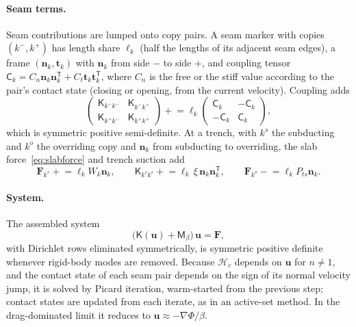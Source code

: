 \documentclass[11pt]{article}
\newcommand{\vect}[1]{\mathbf{#1}}
\newcommand{\Hint}{\mathcal{H}}
\begin{document}
\paragraph{Seam terms.} Seam contributions are lumped onto copy pairs. A seam marker with copies $(k^-,k^+)$ has length share $\ell_k$ (half the lengths of its adjacent seam edges), a frame $(\vect{n}_k,\vect{t}_k)$ with $\vect{n}_k$ from side $-$ to side $+$, and coupling tensor $\mathsf{C}_k=C_n\vect{n}_k\vect{n}_k^{\mathsf T}+C_t\vect{t}_k\vect{t}_k^{\mathsf T}$, where $C_n$ is the free or the stiff value according to the pair's contact state (closing or opening, from the current velocity). Coupling adds
\begin{equation}
  \begin{pmatrix}\mathsf{K}_{k^-k^-}&\mathsf{K}_{k^-k^+}\\\mathsf{K}_{k^+k^-}&\mathsf{K}_{k^+k^+}\end{pmatrix}
  \mathrel{+}= \ell_k\begin{pmatrix}\mathsf{C}_k&-\mathsf{C}_k\\-\mathsf{C}_k&\mathsf{C}_k\end{pmatrix},
\end{equation}
which is symmetric positive semi-definite. At a trench, with $k^s$ the subducting and $k^o$ the overriding copy and $\vect{n}_k$ from subducting to overriding, the slab force~\eqref{eq:slabforce} and trench suction add
\begin{equation}
  \vect{F}_{k^s}\mathrel{+}=\ell_kW_k\vect{n}_k,\qquad
  \mathsf{K}_{k^sk^s}\mathrel{+}=\ell_k\,\xi\,\vect{n}_k\vect{n}_k^{\mathsf T},\qquad
  \vect{F}_{k^o}\mathrel{-}=\ell_kP_{ts}\vect{n}_k.
\end{equation}

\paragraph{System.} The assembled system
\begin{equation}
  \big(\mathsf{K}(\vect{u})+\mathsf{M}_\beta\big)\,\vect{u}=\vect{F},
  \label{eq:system}
\end{equation}
with Dirichlet rows eliminated symmetrically, is symmetric positive definite whenever rigid-body modes are removed. Because $\Hint_c$ depends on $\vect{u}$ for $n\ne1$, and the contact state of each seam pair depends on the sign of its normal velocity jump, it is solved by Picard iteration, warm-started from the previous step; contact states are updated from each iterate, as in an active-set method. In the drag-dominated limit it reduces to $\vect{u}\approx-\nabla\Phi/\beta$.
\end{document}
